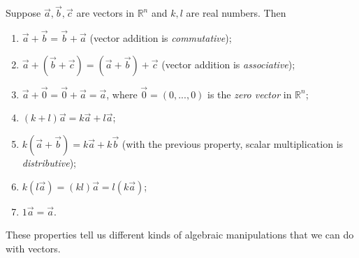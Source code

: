 \documentclass{ximera}
\begin{document}
\begin{proposition}
Suppose $\vec{a},\vec{b},\vec{c}$ are vectors in $\mathbb{R}^n$ and $k,l$ are real numbers. Then 
\begin{enumerate}
\item $\vec{a}+\vec{b} = \vec{b}+\vec{a}$ (vector addition is \emph{commutative});
\item $\vec{a}+(\vec{b}+\vec{c}) = (\vec{a}+\vec{b})+\vec{c}$ (vector addition is \emph{associative});
\item $\vec{a}+\vec{0} = \vec{0}+\vec{a} = \vec{a}$, where $\vec{0} = (0,...,0)$ is the \emph{zero vector} in $\mathbb{R}^n$;
\item $(k+l)\vec{a} = k\vec{a}+l\vec{a}$;
\item $k(\vec{a}+\vec{b}) = k\vec{a}+k\vec{b}$ (with the previous property, scalar multiplication is \emph{distributive});
\item $k(l\vec{a})=(kl)\vec{a} = l(k\vec{a})$;
\item $1\vec{a} = \vec{a}$.
\end{enumerate}
\end{proposition}

These properties tell us different kinds of algebraic manipulations that we can do with vectors.
\end{document}
